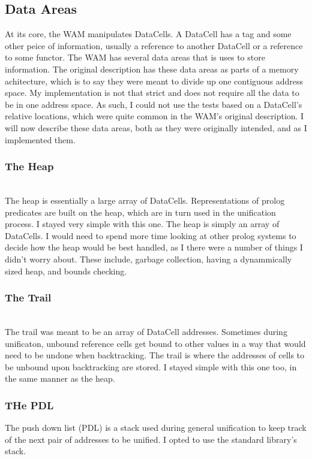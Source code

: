 \documentclass{article}
\begin{document}
\subsection {Data Areas}
At its core, the WAM manipulates DataCells. A DataCell has a tag and some other peice of information, usually a reference to another DataCell or a reference to some functor. The WAM has several data areas that is uses to store information. The original description has these data areas as parts of a memory achitecture, which is to say they were meant to divide up one contiguous address space. My implementation is not that strict and does not require all the data to be in one address space. As such, I could not use the tests based on a DataCell's relative locations, which were quite common in the WAM's original description. I will now describe these data areas, both as they were originally intended, and as I implemented them. 
\subsubsection{The Heap}\\
The heap is essentially a large array of DataCells. Representations of prolog predicates are built on the heap, which are in turn used in the unification process. I stayed very simple with this one. The heap is simply an array of DataCells. I would need to spend more time looking at other prolog systems to decide how the heap would be best handled, as I there were a number of things I didn't worry about. These include, garbage collection, having a dynammically sized heap, and bounds checking.

\subsubsection{The Trail}\\
The trail was meant to be an array of DataCell addresses. Sometimes during unificaton, unbound reference cells get bound to other values in a way that would need to be undone when backtracking. The trail is where the addresses of cells to be unbound upon backtracking are stored. I stayed simple with this one too, in the same manner as the heap.

\subsubsection{THe PDL}
The push down list (PDL) is a stack used during general unification to keep track of the next pair of addresses to be unified. I opted to use the standard library's stack.
\end{document}
